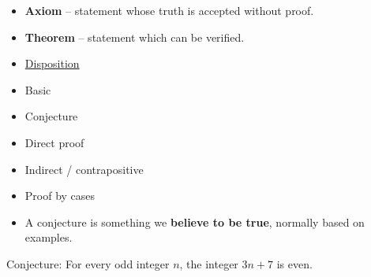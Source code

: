 \documentclass[english,10pt,a4paper]{article}
\begin{document}
\begin{minipage}{0.7\linewidth}
\begin{theo}[Basic] 
\begin{itemize}
\item \textbf{Axiom} -- statement whose truth is accepted without proof.
\item \textbf{Theorem} -- statement which can be verified.
\end{itemize}
\end{theo}
\end{minipage}
\hspace{0.1cm}
\begin{minipage}{0.27\linewidth}
\begin{itemize}
\item[] \underline{Disposition}
\item Basic
\item Conjecture
\item Direct proof
\item Indirect / contrapositive
\item Proof by cases
\end{itemize}
\end{minipage}



\begin{theo}[Conjecture] 

\begin{minipage}[t]{0.48\linewidth}
\begin{itemize}
\item A conjecture is something we \textbf{believe to be true}, normally based on examples.
\end{itemize}
\end{minipage}
\hspace{0.1cm}
\begin{minipage}[t]{0.48\linewidth}
Conjecture: For every odd integer $n$, the integer $3n+7$ is even.
\end{minipage}
\end{theo}
\end{document}
